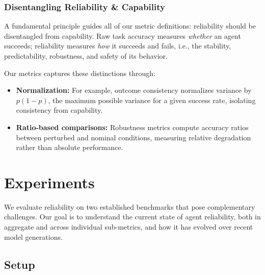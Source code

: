 \documentclass[11pt]{article}
\begin{document}
\subsubsection{Disentangling Reliability \& Capability}
\label{appendix:disentanglement}

A fundamental principle guides all of our metric definitions: reliability should be disentangled from capability.
Raw task accuracy measures \emph{whether} an agent succeeds; reliability measures \emph{how} it succeeds and fails, i.e., the stability, predictability, robustness, and safety of its behavior.

Our metrics captures these distinctions through:
\begin{itemize}[leftmargin=*, topsep=2pt]
    \item \textbf{Normalization:} For example, outcome consistency normalizes variance by $p(1-p)$, the maximum possible variance for a given success rate, isolating consistency from capability.
    \item \textbf{Ratio-based comparisons:} Robustness metrics compute accuracy ratios between perturbed and nominal conditions, measuring relative degradation rather than absolute performance.
\end{itemize}

\section{Experiments}
\label{sec:experiments}

We evaluate reliability on two established benchmarks that pose complementary challenges. Our goal is to understand the current state of agent reliability, both in aggregate and across individual sub-metrics, and how it has evolved over recent model generations.

\subsection{Setup}
\label{sec:exp-setup}
\end{document}
